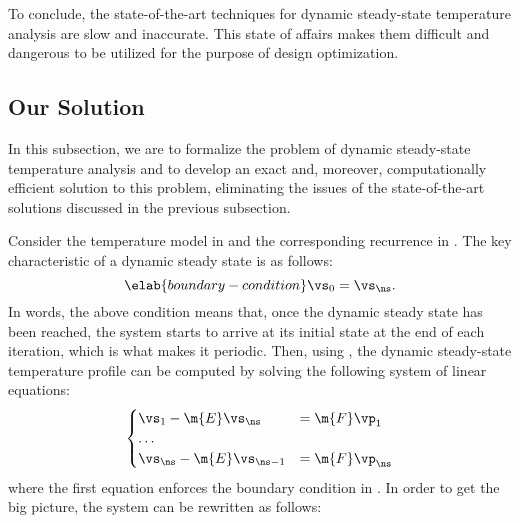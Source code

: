 To conclude, the state-of-the-art techniques for dynamic steady-state
temperature analysis are slow and inaccurate. This state of affairs makes them
difficult and dangerous to be utilized for the purpose of design optimization.

\subsection{Our Solution}

In this subsection, we are to formalize the problem of dynamic steady-state
temperature analysis and to develop an exact and, moreover, computationally
efficient solution to this problem, eliminating the issues of the
state-of-the-art solutions discussed in the previous subsection.

Consider the temperature model in  and the corresponding
recurrence in . The key characteristic of a dynamic steady
state is as follows:
\begin{equation} \elab{boundary-condition}
  \vs_0 = \vs_\ns.
\end{equation}
In words, the above condition means that, once the dynamic steady state has been
reached, the system starts to arrive at its initial state at the end of each
iteration, which is what makes it periodic. Then, using , the
dynamic steady-state temperature profile can be computed by solving the
following system of linear equations:
\[
  \begin{cases}
    \vs_1 - \m{E} \vs_\ns & = \m{F} \vp_1 \\
    \dots \\
    \vs_\ns - \m{E} \vs_{\ns - 1} & = \m{F} \vp_\ns
  \end{cases}
\]
where the first equation enforces the boundary condition in
. In order to get the big picture, the system can be
rewritten as follows:
